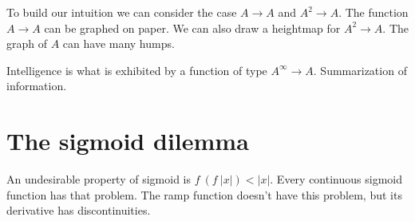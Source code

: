 To build our intuition we can consider the case \(A \to A\) and \(A^2 \to A\).
The function \(A \to A\) can be graphed on paper.
We can also draw a heightmap for \(A^2 \to A\).
The graph of \(A\) can have many humps.

Intelligence is what is exhibited by a function of type \(A^\infty \to A\).
Summarization of information.

\section{The sigmoid dilemma}

An undesirable property of sigmoid is \(f~(f~|x|) < |x|\).
Every continuous sigmoid function has that problem.
The ramp function doesn't have this problem,
but its derivative has discontinuities.
